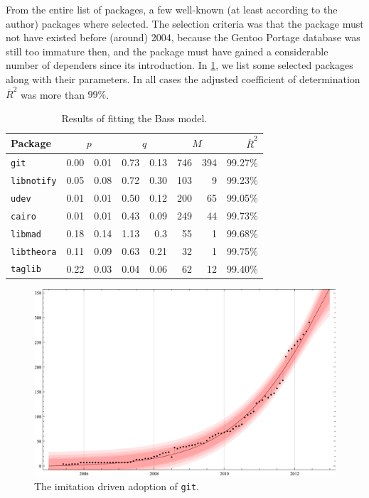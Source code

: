 \documentclass[smallextended,final]{svjour3}
\begin{document}
From the entire list of packages, a few well-known (at least according to the author) packages where selected. The selection criteria was that the package must not have existed before (around) 2004, because the Gentoo Portage database was still too immature then, and the package must have gained a considerable number of dependers since its introduction. In \ref{tbl:results}, we list some selected packages along with their parameters. In all cases the adjusted coefficient of determination $\overline{R}^2$ was more than $99\%$.

\begin{table}
\small\centering
\caption{Results of fitting the Bass model.}\label{tbl:results}
\begin{tabular}{lr@{ $\pm$}rr@{ $\pm$}rr@{ $\pm$}rr}
\toprule
Package & \multicolumn{2}{c}{$p$} & \multicolumn{2}{c}{$q$} & \multicolumn{2}{c}{$M$} & $\overline{R}^2$\\
\midrule
\texttt{git}         & 0.00 & 0.01    & 0.73 & 0.13   & 746 & 394 & 99.27\%\\
\texttt{libnotify}   & 0.05 & 0.08    & 0.72 & 0.30   & 103 &   9 & 99.23\%\\
\texttt{udev}        & 0.01 & 0.01    & 0.50 & 0.12   & 200 &  65 & 99.05\%\\
\texttt{cairo}       & 0.01 & 0.01    & 0.43 & 0.09   & 249 &  44 & 99.73\%\\
\texttt{libmad}      & 0.18 & 0.14    & 1.13 & 0.3    &  55 &   1 & 99.68\%\\
\texttt{libtheora}   & 0.11 & 0.09    & 0.63 & 0.21   &  32 &   1 & 99.75\%\\
\texttt{taglib}      & 0.22 & 0.03    & 0.04 & 0.06   &  62 &  12 & 99.40\%\\
\bottomrule
\end{tabular}
\end{table}

\begin{figure}
\small\centering
\includegraphics[width=\linewidth]{BassFit-git2.pdf}
\vspace{-2em}
\caption{The imitation driven adoption of \texttt{git}.}\label{fig:git}
\vspace{-1.5em}
\end{figure}
\end{document}
